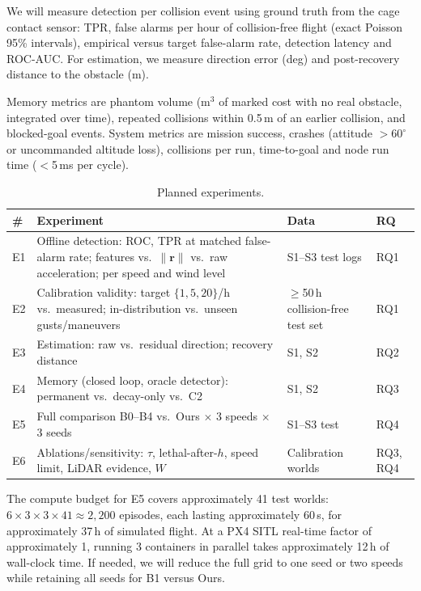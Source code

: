 \documentclass[conference,10pt]{IEEEtran}
\begin{document}
We will measure detection per collision event using ground truth from the cage contact sensor: TPR, false alarms per hour of collision-free flight (exact Poisson 95\% intervals), empirical versus target false-alarm rate, detection latency and ROC-AUC. For estimation, we measure direction error (deg) and post-recovery distance to the obstacle (m).

Memory metrics are phantom volume (m$^3$ of marked cost with no real obstacle, integrated over time), repeated collisions within 0.5\,m of an earlier collision, and blocked-goal events. System metrics are mission success, crashes (attitude $>60^\circ$ or uncommanded altitude loss), collisions per run, time-to-goal and node run time ($<$5\,ms per cycle).

\begin{table}[t]
\caption{Planned experiments.}
\label{tab:exp}
\footnotesize
\begin{tabularx}{\columnwidth}{@{}L{0.5cm}YL{1.6cm}L{0.75cm}@{}}
\toprule
\# & \textbf{Experiment} & \textbf{Data} & \textbf{RQ}\\
\midrule
E1 & Offline detection: ROC, TPR at matched false-alarm rate; features vs.\ $\|\mathbf{r}\|$ vs.\ raw acceleration; per speed and wind level & S1--S3 test logs & RQ1\\
E2 & Calibration validity: target $\{1,5,20\}$/h vs.\ measured; in-distribution vs.\ unseen gusts/maneuvers & $\ge$50\,h collision-free test set & RQ1\\
E3 & Estimation: raw vs.\ residual direction; recovery distance & S1, S2 & RQ2\\
E4 & Memory (closed loop, oracle detector): permanent vs.\ decay-only vs.\ C2 & S1, S2 & RQ3\\
E5 & Full comparison B0--B4 vs.\ Ours $\times$ 3 speeds $\times$ 3 seeds & S1--S3 test & RQ4\\
E6 & Ablations/sensitivity: $\tau$, lethal-after-$h$, speed limit, LiDAR evidence, $W$ & Calibration worlds & RQ3, RQ4\\
\bottomrule
\end{tabularx}
\end{table}

The compute budget for E5 covers approximately 41 test worlds: $6\times3\times3\times41\approx2{,}200$ episodes, each lasting approximately 60\,s, for approximately 37\,h of simulated flight. At a PX4 SITL real-time factor of approximately 1, running 3 containers in parallel takes approximately 12\,h of wall-clock time. If needed, we will reduce the full grid to one seed or two speeds while retaining all seeds for B1 versus Ours.
\end{document}
